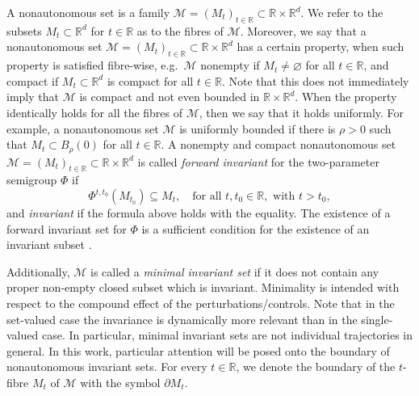 \documentclass[reqno]{amsart}
\theoremstyle{definition}
\numberwithin{equation}{section}
\newcommand{\R}{\mathbb{R}}
\newcommand{\M}{\mathscr{M}}
\begin{document}
A nonautonomous set is a family $\M=(M_t)_{t\in\R}\subset \R\times \R^d$. We refer to the subsets $M_t\subset \R^d$ for $t\in\R $ as to the fibres of $\M$.
Moreover, we say that  a nonautonomous set $\mathscr{M}=(M_t)_{t\in\R}\subset\R\times \R^d$ has a certain property, when such property is satisfied fibre-wise, e.g.~$\mathscr{M}$ nonempty if $M_t\neq\varnothing$ for all $t\in\R $, and compact if $M_t\subset\R^d$ is compact for all $t\in\R $. Note that this does not immediately imply that $\M$ is compact and not even bounded in $\R \times \R^d$. 
When the property identically holds for all the fibres of $\M$, then we say that it holds uniformly. For example, a nonautonomous set $\M$ is uniformly bounded if there is $\rho>0$ such that $M_t\subset B_\rho(0)$ for all $t\in\mathbb{R}$. 
A nonempty and compact  nonautonomous set $\M=(M_t)_{t\in\R}\subset\R\times \R^d$ is called \emph{forward invariant} for the two-parameter semigroup  $\Phi$ if 
\[
\Phi^{t,t_0}(M_{t_0} )\subseteq M_t,\quad\text{for all }t,t_0\in\R, \text{ with }t>t_0,
\]
and \emph{invariant} if the formula above holds with the equality. The existence of a forward invariant set for $\Phi$ is a sufficient condition for the existence of an invariant subset \cite{kloeden2011negatively}. 

Additionally, $\M$ is called a \emph{minimal invariant set} if it does not contain any proper non-empty closed subset which is invariant. Minimality is intended with respect to the compound effect of the perturbations/controls. Note that in the set-valued case the invariance is dynamically more relevant than in the single-valued case. In particular, minimal invariant sets are not individual trajectories in general. In this work, particular attention will be posed onto the boundary of nonautonomous invariant sets. For every $t\in\R$, we denote the boundary of the $t$-fibre $M_t$ of $\M$ with the symbol $\partial M_t$.
\end{document}
